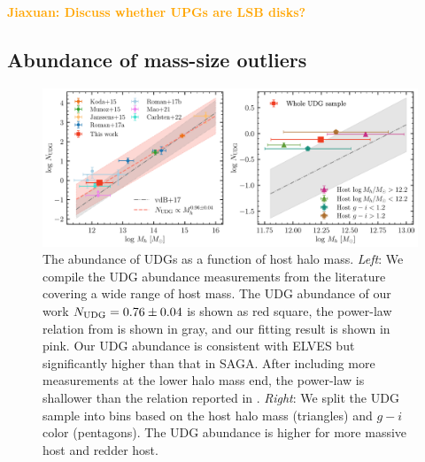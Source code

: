 \documentclass[twocolumn,astrosymb,twocolappendix]{aastex631}
\newcommand{\jiaxuan}[1]{\textcolor{orange}{\textbf{Jiaxuan: #1}}}
\begin{document}
\begin{CJK*}{UTF8}{gbsn}
\jiaxuan{Discuss whether UPGs are LSB disks?}





\subsection{Abundance of mass-size outliers}\label{sec:n_udg}

\begin{figure}
	\vbox{ 
		\centering
		\includegraphics[width=1\linewidth]{N_UDG_host_mass.pdf}
	}
    \caption{The abundance of UDGs as a function of host halo mass. \textit{Left}: We compile the UDG abundance measurements from the literature covering a wide range of host mass. The UDG abundance of our work $N_{\rm UDG} = 0.76\pm 0.04$ is shown as red square, the power-law relation from \citet{vdBurg2017} is shown in gray, and our fitting result is shown in pink. Our UDG abundance is consistent with ELVES but significantly higher than that in SAGA. After including more measurements at the lower halo mass end, the power-law is shallower than the relation reported in \citet{vdBurg2017}. \textit{Right}: We split the UDG sample into bins based on the host halo mass (triangles) and $g-i$ color (pentagons). The UDG abundance is higher for more massive host and redder host. }
    \label{fig:n_udg}
\end{figure}


\end{CJK*}
\end{document}

